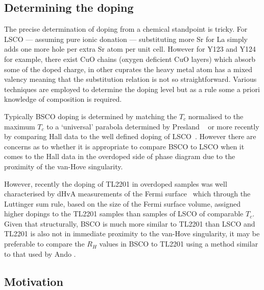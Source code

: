 
\subsection{Determining the doping}
    \label{Sec:Intro:DeterminingDoping}

The precise determination of doping from a chemical standpoint is tricky. For \ac{LSCO} --- assuming pure ionic donation --- substituting more Sr for La simply adds one more hole per extra Sr atom per unit cell. However for \ac{Y123} and \ac{Y124} for example, there exist CuO chains (oxygen deficient CuO layers) which absorb some of the doped charge, in other cuprates the heavy metal atom has a mixed valency meaning that the substitution relation is not so straightforward. Various techniques are employed to determine the doping level but as a rule some a priori knowledge of composition is required.

Typically \ac{BSCO} doping is determined by matching the $T_c$ normalised to the maximum $T_c$ to a `universal' parabola determined by Presland \etal~\cite{Presland1991} or more recently by comparing Hall data to the well defined doping of \ac{LSCO}~\cite{Ando2000}. However there are concerns as to whether it is appropriate to compare \ac{BSCO} to \ac{LSCO} when it comes to the Hall data in the overdoped side of phase diagram due to the proximity of the van-Hove singularity.

However, recently the doping of \ac{TL2201} in overdoped samples was well characterised by \ac{dHvA} measurements of the Fermi surface~\cite{Rourke2010b} which through the Luttinger sum rule, based on the size of the Fermi surface volume, assigned higher dopings to the \ac{TL2201} samples than samples of \ac{LSCO} of comparable $T_c$. Given that structurally, \ac{BSCO} is much more similar to \ac{TL2201} than \ac{LSCO} and \ac{TL2201} is also not in immediate proximity to the van-Hove singularity, it may be preferable to compare the $R_H$ values in \ac{BSCO} to \ac{TL2201} using a method similar to that used by Ando \etal.

\subsection{Motivation}

